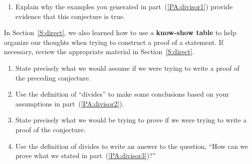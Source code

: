 \begin{previewactivity}
\setcounter{oldenumi}{\theenumi}
\begin{enumerate} \setcounter{enumi}{\theoldenumi}
\item Explain why the examples you generated in part~(\ref{PA:divisor1}) provide evidence that this conjecture is true.
\end{enumerate}
\setlength{\hangindent}{0pt}
In Section~\ref{S:direct}, we also learned how to use a \textbf{know-show table} to help organize our thoughts when trying to construct a proof of a statement.  If necessary, review the appropriate material in Section~\ref{S:direct}.
\setcounter{oldenumi}{\theenumi}
\begin{enumerate} \setcounter{enumi}{\theoldenumi}
  \item  State precisely what we would assume if we were trying to write a proof of the preceding conjecture. \label{PA:divisor2}
  \item Use the definition of ``divides'' to make some conclusions based on your assumptions in part~(\ref{PA:divisor2}).
  \item State precisely what we would be trying to prove if we were trying to write a proof of the conjecture. \label{PA:divisor3}
  \item Use the definition of divides to write an answer to the question, ``How can we prove what we stated in part~(\ref{PA:divisor3})?''
\end{enumerate}

\hbreak
\end{previewactivity}


\endinput
